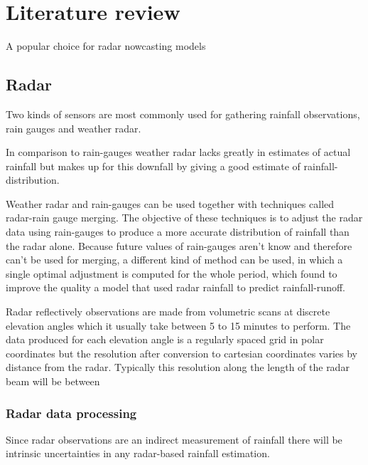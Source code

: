 \chapter{Literature review} \label{sec:Literature review}

A popular choice for radar nowcasting models \cite{shi2015convolutional}


\section{Radar}
Two kinds of sensors are most commonly used for gathering rainfall observations, rain gauges and weather radar. %

In comparison to rain-gauges weather radar lacks greatly in estimates of actual rainfall but makes up for this downfall by giving a good estimate of rainfall-distribution.

Weather radar and rain-gauges can be used together with techniques called radar-rain gauge merging. The objective of these techniques is to adjust the radar data using rain-gauges to produce a more accurate distribution of rainfall than the radar alone\cite{RN301}. Because future values of rain-gauges aren't know and therefore can't be used for merging, a different kind of method can be used, in which a single optimal adjustment is computed for the whole period, which \cite{LOWE2014397} found to improve the quality a model that used radar rainfall to predict rainfall-runoff. 


Radar reflectively observations are made from volumetric scans at discrete elevation angles which it usually take between 5 to 15 minutes to perform. The data produced for each elevation angle is a regularly spaced grid in polar coordinates but the resolution after conversion to cartesian coordinates varies by distance from the radar. Typically this resolution along the length of the radar beam will be between 

\subsection{Radar data processing}
Since radar observations are an indirect measurement of rainfall there will be intrinsic uncertainties in any radar-based rainfall estimation. 

